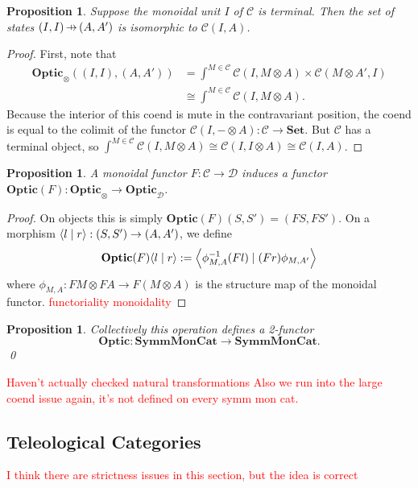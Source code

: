 \documentclass[11pt,a4paper]{article}
\theoremstyle{plain}
\newtheorem{proposition}[theorem]{Proposition}
\theoremstyle{definition}
\newcommand{\C}{\mathscr{C}}
\newcommand{\D}{\mathscr{D}}
\newcommand{\Set}{\mathbf{Set}}
\newcommand{\SymmMonCat}{\mathbf{SymmMonCat}}
\newcommand{\Optic}{\mathbf{Optic}}
\newcommand{\rep}[2]{{\ensuremath \left\langle #1 \mid #2 \right\rangle}}
\newcommand{\hto}{\ensuremath{\,\mathaccent\shortmid\rightarrow\,}}
\newcommand{\todo}[1]{\textcolor{red}{\small #1}}
\begin{document}
\begin{proposition}
  Suppose the monoidal unit $I$ of $\C$ is terminal. Then the set of states $(I, I) \hto (A, A')$ is isomorphic to $\C(I, A)$.
\end{proposition}
\begin{proof}
  First, note that
  \begin{align*}
    \Optic_\otimes((I,I), (A,A'))
    &= \int^{M \in \C} \C(I, M \otimes A) \times \C(M \otimes A', I) \\
    &\cong \int^{M \in \C} \C(I, M \otimes A).
  \end{align*}
  Because the interior of this coend is mute in the contravariant position, the coend is equal to the colimit of the functor $\C(I, - \otimes A) : \C \to \Set$. But $\C$ has a terminal object, so $\int^{M \in \C} \C(I, M \otimes A) \cong \C(I, I \otimes A) \cong \C(I, A)$.
\end{proof}

\begin{proposition}\label{prop:change-of-action-monoidal}
  A monoidal functor $F : \C \to \D$ induces a functor $\Optic(F) : \Optic_\otimes \to \Optic_\D$.
\end{proposition}
\begin{proof}
  On objects this is simply $\Optic(F)(S, S') = (FS, FS')$. On a morphism $\rep{l}{r} : (S, S') \to (A, A')$, we define
  \begin{align*}
    \Optic(F)\rep{l}{r} := \rep{\phi^{-1}_{M,A} (Fl)}{(Fr) \phi_{M,A'}}
  \end{align*}
  where $\phi_{M,A} : FM \otimes FA \to F(M \otimes A)$ is the structure map of the monoidal functor.
  \todo{functoriality}
  \todo{monoidality}
\end{proof}

\begin{proposition}\label{prop-optic-functor}
  Collectively this operation defines a 2-functor \[\Optic : \SymmMonCat \to \SymmMonCat.\] \qed
\end{proposition}
\todo{Haven't actually checked natural transformations}
\todo{Also we run into the large coend issue again, it's not defined on every symm mon cat.}

\subsection{Teleological Categories}\label{sec:teleological-categories}
\todo{I think there are strictness issues in this section, but the idea is correct}
\end{document}
